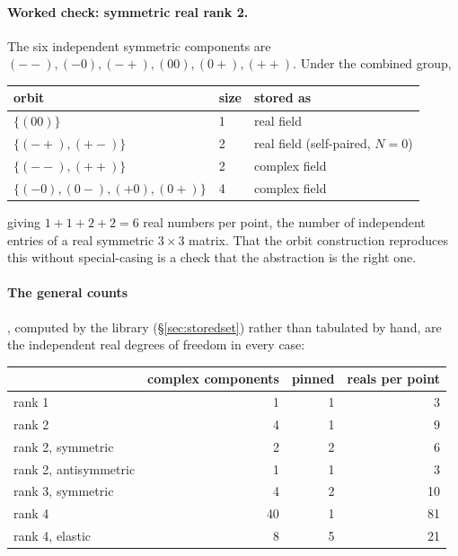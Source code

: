 \documentclass[11pt,a4paper]{article}
\begin{document}
\paragraph{Worked check: symmetric real rank 2.}  The six independent
symmetric components are $(--), (-0), (-+), (00), (0+), (++)$.  Under the
combined group,
\begin{center}
  \begin{tabular}{lll}
    \toprule
    orbit & size & stored as \\
    \midrule
    $\{(00)\}$                    & 1 & real field \\
    $\{(-+), (+-)\}$              & 2 & real field (self-paired, $N=0$) \\
    $\{(--), (++)\}$              & 2 & complex field \\
    $\{(-0), (0-), (+0), (0+)\}$  & 4 & complex field \\
    \bottomrule
  \end{tabular}
\end{center}
giving $1+1+2+2=6$ real numbers per point, the number of independent
entries of a real symmetric $3\times3$ matrix.  That the orbit
construction reproduces this without special-casing is a check that the
abstraction is the right one.

\paragraph{The general counts}, computed by the library
(\S\ref{sec:storedset}) rather than tabulated by hand, are the independent
real degrees of freedom in every case:

\begin{center}
\begin{tabular}{lrrr}
  \toprule
  & complex components & pinned & reals per point \\
  \midrule
  rank 1                & 1  & 1 & 3 \\
  rank 2                & 4  & 1 & 9 \\
  rank 2, symmetric     & 2  & 2 & 6 \\
  rank 2, antisymmetric & 1  & 1 & 3 \\
  rank 3, symmetric     & 4  & 2 & 10 \\
  rank 4                & 40 & 1 & 81 \\
  rank 4, elastic       & 8  & 5 & 21 \\
  \bottomrule
\end{tabular}
\end{center}
\end{document}
